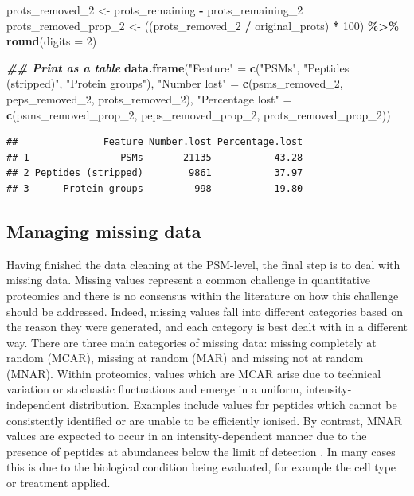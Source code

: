 \documentclass[9pt,a4paper,]{extarticle}
\newenvironment{Shaded}{\begin{snugshade}}{\end{snugshade}}
\newcommand{\AttributeTok}[1]{\textcolor[rgb]{0.13,0.29,0.53}{#1}}
\newcommand{\DecValTok}[1]{\textcolor[rgb]{0.00,0.00,0.81}{#1}}
\newcommand{\DocumentationTok}[1]{\textcolor[rgb]{0.56,0.35,0.01}{\textbf{\textit{#1}}}}
\newcommand{\FunctionTok}[1]{\textcolor[rgb]{0.13,0.29,0.53}{\textbf{#1}}}
\newcommand{\NormalTok}[1]{#1}
\newcommand{\OtherTok}[1]{\textcolor[rgb]{0.56,0.35,0.01}{#1}}
\newcommand{\SpecialCharTok}[1]{\textcolor[rgb]{0.81,0.36,0.00}{\textbf{#1}}}
\newcommand{\StringTok}[1]{\textcolor[rgb]{0.31,0.60,0.02}{#1}}
\begin{document}
\begin{Shaded}
\begin{Highlighting}[]
\NormalTok{prots\_removed\_2 }\OtherTok{\textless{}{-}}\NormalTok{ prots\_remaining }\SpecialCharTok{{-}}\NormalTok{ prots\_remaining\_2}
\NormalTok{prots\_removed\_prop\_2 }\OtherTok{\textless{}{-}}\NormalTok{ ((prots\_removed\_2 }\SpecialCharTok{/}\NormalTok{ original\_prots) }\SpecialCharTok{*} \DecValTok{100}\NormalTok{) }\SpecialCharTok{\%\textgreater{}\%}
  \FunctionTok{round}\NormalTok{(}\AttributeTok{digits =} \DecValTok{2}\NormalTok{)}


\DocumentationTok{\#\# Print as a table}
\FunctionTok{data.frame}\NormalTok{(}\StringTok{"Feature"} \OtherTok{=} \FunctionTok{c}\NormalTok{(}\StringTok{"PSMs"}\NormalTok{,}
                         \StringTok{"Peptides (stripped)"}\NormalTok{,}
                         \StringTok{"Protein groups"}\NormalTok{),}
           \StringTok{"Number lost"} \OtherTok{=} \FunctionTok{c}\NormalTok{(psms\_removed\_2,}
\NormalTok{                             peps\_removed\_2,}
\NormalTok{                             prots\_removed\_2),}
           \StringTok{"Percentage lost"} \OtherTok{=} \FunctionTok{c}\NormalTok{(psms\_removed\_prop\_2,}
\NormalTok{                                 peps\_removed\_prop\_2,}
\NormalTok{                                 prots\_removed\_prop\_2))}
\end{Highlighting}
\end{Shaded}

\begin{verbatim}
##               Feature Number.lost Percentage.lost
## 1                PSMs       21135           43.28
## 2 Peptides (stripped)        9861           37.97
## 3      Protein groups         998           19.80
\end{verbatim}

\subsection{Managing missing data}\label{managing-missing-data}

Having finished the data cleaning at the PSM-level, the final step is to deal
with missing data. Missing values represent a common challenge in quantitative
proteomics and there is no consensus within the literature on how this challenge
should be addressed. Indeed, missing values fall into different categories based
on the reason they were generated, and each category is best dealt with in a
different way. There are three main categories of missing data: missing
completely at random (MCAR), missing at random (MAR) and missing not at random
(MNAR). Within proteomics, values which are MCAR arise due to technical
variation or stochastic fluctuations and emerge in a uniform,
intensity-independent distribution. Examples include values for peptides which
cannot be consistently identified or are unable to be efficiently ionised. By
contrast, MNAR values are expected to occur in an intensity-dependent manner due
to the presence of peptides at abundances below the limit of detection
\citep{Karpievitch2009, Lazar2016, QFeat}. In many cases this is due to the biological
condition being evaluated, for example the cell type or treatment applied.
\end{document}
